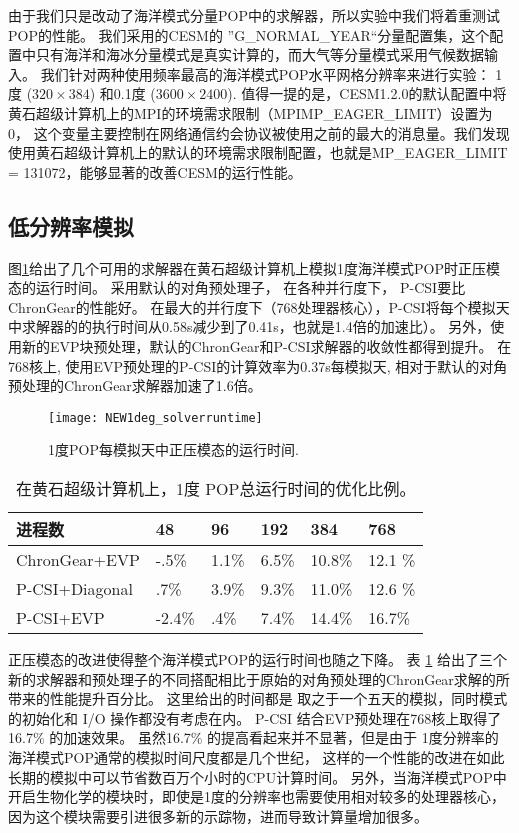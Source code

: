 由于我们只是改动了海洋模式分量POP中的求解器，所以实验中我们将着重测试POP的性能。 
我们采用的CESM的
”G\_NORMAL\_YEAR“分量配置集，这个配置中只有海洋和海冰分量模式是真实计算的，而大气等分量模式采用气候数据输入。
我们针对两种使用频率最高的海洋模式POP水平网格分辨率来进行实验：
1度 ($320\times 384$) 和0.1度 ($3600\times 2400$).
值得一提的是，CESM1.2.0的默认配置中将黄石超级计算机上的MPI的环境需求限制（MPIMP\_EAGER\_LIMIT）设置为0， 这个变量主要控制在网络通信约会协议被使用之前的最大的消息量。我们发现使用黄石超级计算机上的默认的环境需求限制配置，也就是MP\_EAGER\_LIMIT = 131072，能够显著的改善CESM的运行性能。 



\subsection{低分辨率模拟}
\label{precond:exp:low}
图\ref{fig:runtime1}给出了几个可用的求解器在黄石超级计算机上模拟1度海洋模式POP时正压模态的运行时间。  
采用默认的对角预处理子， 在各种并行度下， P-CSI要比ChronGear的性能好。
在最大的并行度下（768处理器核心），P-CSI将每个模拟天中求解器的的执行时间从0.58s减少到了0.41s，也就是1.4倍的加速比）。 
另外，使用新的EVP块预处理，默认的ChronGear和P-CSI求解器的收敛性都得到提升。 
在768核上, 使用EVP预处理的P-CSI的计算效率为0.37s每模拟天, 相对于默认的对角预处理的ChronGear求解器加速了1.6倍。 

\begin {figure}
\centering
\texttt{[image: NEW1deg\_solverruntime]}
\caption []{1度POP每模拟天中正压模态的运行时间.\label {fig:runtime1}}
\end {figure}

\begin{table}[!h]
\begin{center}
\caption{在黄石超级计算机上，1度 POP总运行时间的优化比例。 \label{tab:improve_1}}
\begin{tabular}{|l||l|l|l|l|l|}
\hline
进程数 & 48  & 96  & 192 & 384 & 768\\\hline
\hline
ChronGear+EVP & -.5\% & 1.1\%  & 6.5\% & 10.8\%  & 12.1 \% \\\hline
P-CSI+Diagonal  & .7\% &3.9\% &9.3\%  &11.0\% & 12.6 \% \\\hline
P-CSI+EVP	      &-2.4\% & .4\%	& 7.4\%  & 14.4\% & 16.7\%\\\hline
\end{tabular}
\end{center}
\end{table}


正压模态的改进使得整个海洋模式POP的运行时间也随之下降。
表 \ref{tab:improve_1} 给出了三个新的求解器和预处理子的不同搭配相比于原始的对角预处理的ChronGear求解的所带来的性能提升百分比。 
这里给出的时间都是 取之于一个五天的模拟，同时模式的初始化和 I/O 操作都没有考虑在内。 
P-CSI 结合EVP预处理在768核上取得了  16.7\% 的加速效果。
虽然16.7\% 的提高看起来并不显著，但是由于 1度分辨率的海洋模式POP通常的模拟时间尺度都是几个世纪， 这样的一个性能的改进在如此长期的模拟中可以节省数百万个小时的CPU计算时间。 
另外，当海洋模式POP中开启生物化学的模块时，即使是1度的分辨率也需要使用相对较多的处理器核心，因为这个模块需要引进很多新的示踪物，进而导致计算量增加很多。 

